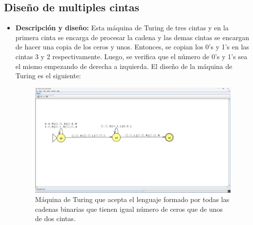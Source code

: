 \documentclass[11pt]{report}
\begin{document}
\subsection{Diseño de multiples cintas}
\begin{itemize}
  \item \textbf{Descripción y diseño:} Esta máquina de Turing de tres cintas y en la primera cinta se encarga de procesar la cadena y las demas cintas se encargan de hacer una copia de los ceros y unos. Entonces, se copian los 0's y 1's en las cintas 3 y 2 respectivamente. Luego, se verifica que el número de 0's y 1's sea el mismo empezando de derecha a izquierda. El diseño de la máquina de Turing es el siguiente:

        \begin{figure}[H]
          \centering
          \includegraphics[scale=0.3]{img/MT_05_multiple_ribbon.png}
          \caption{Máquina de Turing que acepta el lenguaje formado por todas las cadenas binarias que tienen igual número de ceros que de unos de dos cintas.}
          \label{fig:maquina de turing que acepta el lenguaje formado por todas las cadenas binarias que tienen igual número de ceros que de unos de dos cintas}
        \end{figure}

        \newpage


\end{itemize}
\end{document}
